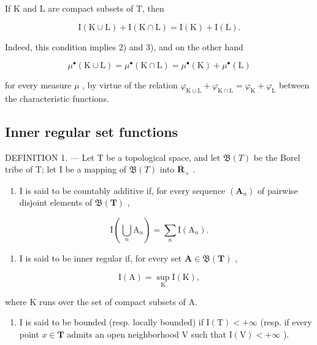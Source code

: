 If K and L are compact subsets of T, then

\[
\mathrm{I} (\mathrm{K} \cup \mathrm{L}) + \mathrm{I} (\mathrm{K} \cap \mathrm{L}) = \mathrm{I} (\mathrm{K}) + \mathrm{I} (\mathrm{L}).
\]

Indeed, this condition implies 2) and 3), and on the other hand

\[
\mu^ {\bullet} (\mathrm{K} \cup \mathrm{L}) = \mu^ {\bullet} (\mathrm{K} \cap \mathrm{L}) = \mu^ {\bullet} (\mathrm{K}) + \mu^ {\bullet} (\mathrm{L})
\]

for every measure \(\mu\) , by virtue of the relation \(\varphi_{\mathrm{K}\cup\mathrm{L}} + \varphi_{\mathrm{K}\cap\mathrm{L}} = \varphi_{\mathrm{K}} + \varphi_{\mathrm{L}}\) between the characteristic functions.

\subsection{Inner regular set functions}

DEFINITION 1. --- Let T be a topological space, and let \(\mathfrak{B}(T)\) be the Borel tribe of T; let I be a mapping of \(\mathfrak{B}(T)\) into \(\overline{\mathbf{R}}_{+}\) .

\begin{enumerate}
\def\labelenumi{\alph{enumi})}
\tightlist
\item
  I is said to be countably additive if, for every sequence \((\mathbf{A}_{n})\) of pairwise disjoint elements of \(\mathfrak{B}(\mathbf{T})\) ,
\end{enumerate}

\[
\mathrm{I} \left(\bigcup_ {n} \mathrm{A} _ {n}\right) = \sum_ {n} \mathrm{I} (\mathrm{A} _ {n}).\tag{4}
\]

\begin{enumerate}
\def\labelenumi{\alph{enumi})}
\setcounter{enumi}{1}
\tightlist
\item
  I is said to be inner regular if, for every set \(\mathbf{A} \in \mathfrak{B}(\mathbf{T})\) ,
\end{enumerate}

\[
\mathrm{I} (\mathrm{A}) = \sup _ {\mathrm{K}} \mathrm{I} (\mathrm{K}),\tag{5}
\]

where K runs over the set of compact subsets of A.

\begin{enumerate}
\def\labelenumi{\alph{enumi})}
\setcounter{enumi}{2}
\tightlist
\item
  I is said to be bounded (resp. locally bounded) if \(\mathrm{I(T)} < +\infty\) (resp. if every point \(x \in \mathbf{T}\) admits an open neighborhood V such that \(\mathrm{I(V)} < +\infty\) ).
\end{enumerate}

